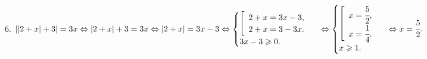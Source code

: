 6. $||2+x|+3|=3x\Leftrightarrow|2+x|+3=3x\Leftrightarrow|2+x|=3x-3\Leftrightarrow\begin{cases}\left[\begin{array}{l} 2+x=3x-3,\\ 2+x=3-3x.\end{array}\right.\\3x-3\geqslant0.\end{cases}\Leftrightarrow\begin{cases}\left[\begin{array}{l} x=\cfrac{5}{2},\\ x=\cfrac{1}{4}.\end{array}\right.\\x\geqslant1.\end{cases}\Leftrightarrow x=\cfrac{5}{2}.$\\
